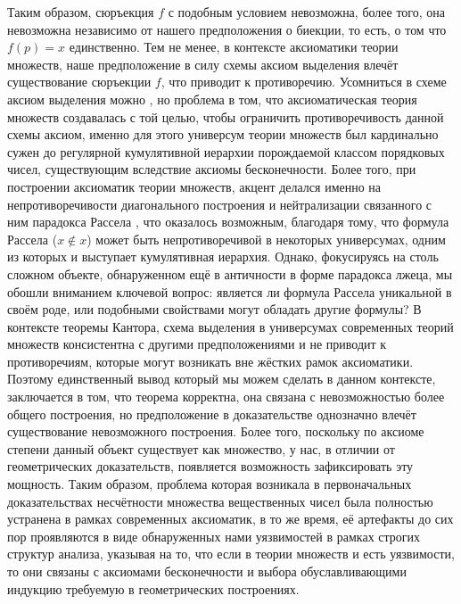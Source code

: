 \documentclass[12pt]{article}
\begin{document}
Таким образом, сюръекция $f$ с подобным условием невозможна, более того, она невозможна независимо от нашего предположения о биекции, то есть, о том что $f(p) = x$ единственно. Тем не менее, в контексте аксиоматики теории множеств, наше предположение в силу схемы аксиом выделения влечёт существование сюръекции $f$, что приводит к противоречию. Усомниться в схеме аксиом выделения можно \cite{diagonal-antinomy}, но проблема в том, что аксиоматическая теория множеств создавалась с той целью, чтобы ограничить противоречивость данной схемы аксиом, именно для этого универсум теории множеств был кардинально сужен до регулярной кумулятивной иерархии порождаемой классом порядковых чисел, существующим вследствие аксиомы бесконечности. Более того, при построении аксиоматик теории множеств, акцент делался именно на непротиворечивости диагонального построения и нейтрализации связанного с ним парадокса Рассела \cite{russell-paradox}, что оказалось возможным, благодаря тому, что формула Рассела ($x \notin x$) может быть непротиворечивой в некоторых универсумах, одним из которых и выступает кумулятивная иерархия. Однако, фокусируясь на столь сложном объекте, обнаруженном ещё в античности в форме парадокса лжеца, мы обошли вниманием ключевой вопрос: является ли формула Рассела уникальной в своём роде, или подобными свойствами могут обладать другие формулы? В контексте теоремы Кантора, схема выделения в универсумах современных теорий множеств консистентна с другими предположениями и не приводит к противоречиям, которые могут возникать вне жёстких рамок аксиоматики. Поэтому единственный вывод который мы можем сделать в данном контексте, заключается в том, что теорема корректна, она связана с невозможностью более общего построения, но предположение в доказательстве однозначно влечёт существование невозможного построения. Более того, поскольку по аксиоме степени данный объект существует как множество, у нас, в отличии от геометрических доказательств, появляется возможность зафиксировать эту мощность. Таким образом, проблема которая возникала в первоначальных доказательствах несчётности множества вещественных чисел была полностью устранена в рамках современных аксиоматик, в то же время, её артефакты до сих пор проявляются в виде обнаруженных нами уязвимостей в рамках строгих структур анализа, указывая на то, что если в теории множеств и есть уязвимости, то они связаны с аксиомами бесконечности и выбора обуславливающими индукцию требуемую в геометрических построениях.
\end{document}
